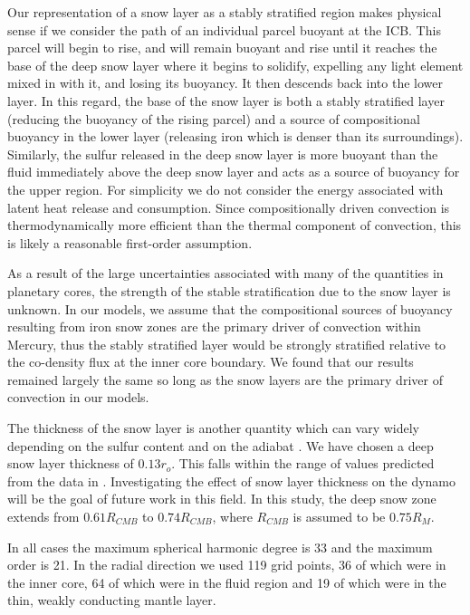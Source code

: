 Our representation of a snow layer as a stably stratified region makes physical sense if we consider the path of an individual parcel buoyant at the ICB. This parcel will begin to rise, and will remain buoyant and rise until it reaches the base of the deep snow layer where it begins to solidify, expelling any light element mixed in with it, and losing its buoyancy. It then descends back into the lower layer. In this regard, the base of the snow layer is both a stably stratified layer (reducing the buoyancy of the rising parcel) and a source of compositional buoyancy in the lower layer (releasing iron which is denser than its surroundings). Similarly, the sulfur released in the deep snow layer is more buoyant than the fluid immediately above the deep snow layer and acts as a source of buoyancy for the upper region. For simplicity we do not consider the energy associated with latent heat release and consumption. Since compositionally driven convection is thermodynamically more efficient than the thermal component of convection, this is likely a reasonable first-order assumption.

As a result of the large uncertainties associated with many of the quantities in planetary cores, the strength of the stable stratification due to the snow layer is unknown. In our models, we assume that the compositional sources of buoyancy resulting from iron snow zones are the primary driver of convection within Mercury, thus the stably stratified layer would be strongly stratified relative to the co-density flux at the inner core boundary. We found that our results remained largely the same so long as the snow layers are the primary driver of convection in our models.

The thickness of the snow layer is another quantity which can vary widely depending on the sulfur content and on the adiabat \citep{chenetal2008}. We have chosen a deep snow layer thickness of $0.13 r_{o}$. This falls within the range of values predicted from the data in \citet{chenetal2008}. Investigating the effect of snow layer thickness on the dynamo will be the goal of future work in this field. In this study, the deep snow zone extends from $0.61 R_{CMB}$ to $0.74 R_{CMB}$, where $R_{CMB}$ is assumed to be $0.75 R_{M}$.

In all cases the maximum spherical harmonic degree is 33 and the maximum order is 21. In the radial direction we used 119 grid points, 36 of which were in the inner core, 64 of which were in the fluid region and 19 of which were in the thin, weakly conducting mantle layer.

